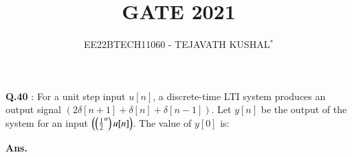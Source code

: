 \documentclass[journal,12pt,twocolumn]{IEEEtran}
\theoremstyle{remark}
\begin{document}

\vspace{3cm}

\title{GATE 2021}
\author{EE22BTECH11060 - TEJAVATH KUSHAL$^{*}$%
}
\maketitle
\newpage
\bigskip

\renewcommand{\thefigure}{\theenumi}
\renewcommand{\thetable}{\theenumi}


\maketitle
\noindent \textbf{Q.40} : 
For a unit step input \( u[n] \), a discrete-time LTI system produces an output signal \( (2\delta[n+1]+\delta[n]+\delta[n-1]) \). Let \( y[n] \) be the output of the system for an input \( \left(\left(\frac{1}{2}^n\right)u[n]\right) \). The value of \( y[0] \) is:
\begin{flushright}
\end{flushright}

\noindent \textbf{Ans.}

\begin{table}[h]
  
\end{table}
\end{document}
